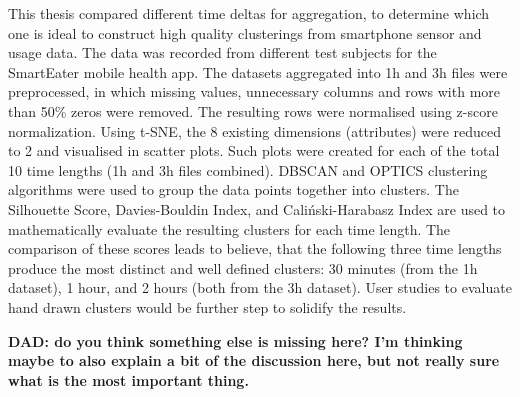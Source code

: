 
This thesis compared different time deltas for aggregation, to determine which one is ideal to construct high quality clusterings from smartphone sensor and usage data. The data was recorded from different test subjects for the SmartEater mobile health app. The datasets aggregated into 1h and 3h files were preprocessed, in which missing values, unnecessary columns and rows with more than 50\% zeros were removed. The resulting rows were normalised using z-score normalization. Using t-SNE, the 8 existing dimensions (attributes) were reduced to 2 and visualised in scatter plots. Such plots were created for each of the total 10 time lengths (1h and 3h files combined). DBSCAN and OPTICS clustering algorithms were used to group the data points together into clusters. The Silhouette Score, Davies-Bouldin Index, and Caliński-Harabasz Index are used to mathematically evaluate the resulting clusters for each time length. The comparison of these scores leads to believe, that the following three time lengths produce the most distinct and well defined clusters:
30 minutes (from the 1h dataset), 1 hour, and 2 hours (both from the 3h dataset). User studies to evaluate hand drawn clusters would be further step to solidify the results.



\textbf{DAD: do you think something else is missing here? I'm thinking maybe to also explain a bit of the discussion here, but not really sure what is the most important thing.}